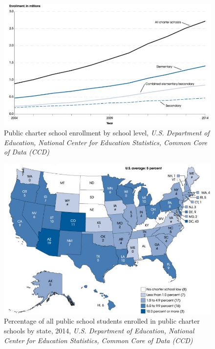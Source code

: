 \documentclass[letterpaper,10pt]{article}
\begin{document}
\begin{figure}[hbt!]
\centering
\includegraphics[scale=0.5]{charter.JPG}
\caption[Public charter school enrollment by school level]{Public charter school enrollment by school level, \textit{U.S. Department of Education, National Center for Education Statistics, Common Core of Data (CCD)}}
\label{img:special_schooltype}
\end{figure}
 
 
\begin{figure}[hbt!]
\centering
\includegraphics[scale=0.5]{percentagebystate.JPG}
\caption[Percentage of all public school students enrolled in public charter schools by state, 2014]{Percentage of all public school students enrolled in public charter schools by state, 2014, \textit{U.S. Department of Education, National Center for Education Statistics, Common Core of Data (CCD)}}
\label{img:special_state}
\end{figure}
\end{document}
